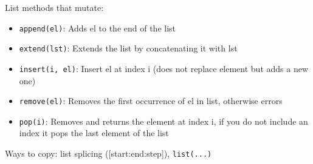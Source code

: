 List methods that mutate:
\begin{itemize}
\item \lstinline{append(el)}: Adds el to the end of the list
\item \lstinline{extend(lst)}: Extends the list by concatenating it with lst
\item \lstinline{insert(i, el)}: Insert el at index i (does not replace element but adds a new one)
\item \lstinline{remove(el)}: Removes the first occurrence of el in list, otherwise errors
\item \lstinline{pop(i)}: Removes and returns the element at index i, if you do not include an index it pops the last element of the list
\end{itemize}
Ways to copy: list splicing ([start:end:step]), \lstinline{list(...)}
